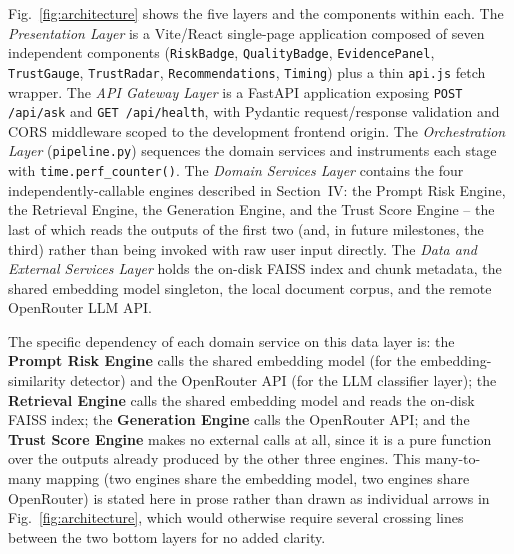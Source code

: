\documentclass[conference]{IEEEtran}
\begin{document}
Fig.~\ref{fig:architecture} shows the five layers and the components within each. The
\emph{Presentation Layer} is a Vite/React single-page application composed of seven
independent components (\texttt{RiskBadge}, \texttt{QualityBadge},
\texttt{EvidencePanel}, \texttt{TrustGauge}, \texttt{TrustRadar},
\texttt{Recommendations}, \texttt{Timing}) plus a thin \texttt{api.js} fetch wrapper. The
\emph{API Gateway Layer} is a FastAPI application exposing \texttt{POST /api/ask} and
\texttt{GET /api/health}, with Pydantic request/response validation and CORS middleware
scoped to the development frontend origin. The \emph{Orchestration Layer}
(\texttt{pipeline.py}) sequences the domain services and instruments each stage with
\texttt{time.perf\_counter()}. The \emph{Domain Services Layer} contains the four
independently-callable engines described in Section~IV: the Prompt Risk Engine, the
Retrieval Engine, the Generation Engine, and the Trust Score Engine -- the last of which
reads the outputs of the first two (and, in future milestones, the third) rather than
being invoked with raw user input directly. The \emph{Data and External Services Layer}
holds the on-disk FAISS index and chunk metadata, the shared embedding model singleton,
the local document corpus, and the remote OpenRouter LLM API.

The specific dependency of each domain service on this data layer is: the
\textbf{Prompt Risk Engine} calls the shared embedding model (for the embedding-similarity
detector) and the OpenRouter API (for the LLM classifier layer); the \textbf{Retrieval
Engine} calls the shared embedding model and reads the on-disk FAISS index; the
\textbf{Generation Engine} calls the OpenRouter API; and the \textbf{Trust Score Engine}
makes no external calls at all, since it is a pure function over the outputs already
produced by the other three engines. This many-to-many mapping (two engines share the
embedding model, two engines share OpenRouter) is stated here in prose rather than drawn
as individual arrows in Fig.~\ref{fig:architecture}, which would otherwise require
several crossing lines between the two bottom layers for no added clarity.
\end{document}
